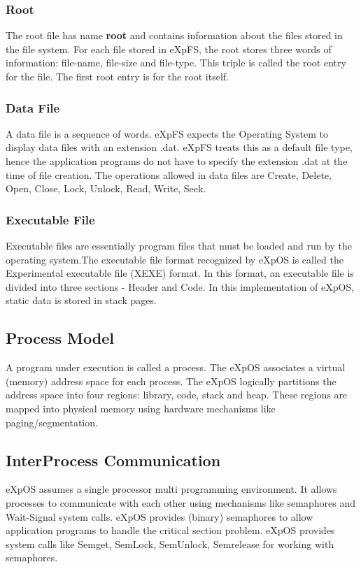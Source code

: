 \documentclass[10pt]{article}
\begin{document}
\subsubsection{Root}
The root file has name \textbf {root} and contains information about the files stored in the file system. For each file stored in eXpFS, the root stores three words of information: file-name, file-size and file-type. This triple is called the root entry for the file. The first root entry is for the root itself.  
\subsubsection{Data File}
A data file is a sequence of words. eXpFS expects the Operating System to display data files with an extension .dat.   eXpFS treats this as a default file type, hence the application programs do not have to specify the extension .dat at the time of file creation.  
The operations allowed in data files are Create, Delete, Open, Close, Lock, Unlock, Read, Write, Seek.
\subsubsection{Executable File}
Executable files are essentially program files that must be loaded and run by the operating system.The executable file format recognized by eXpOS is called the Experimental executable file (XEXE) format. In this format, an executable file is divided into three sections - Header and Code. In this implementation of eXpOS, static data is stored in stack pages.
\subsection{Process Model}
A program under execution is called a process. The eXpOS associates a virtual (memory) address space for each process. The eXpOS logically partitions the address space into four regions: library, code, stack and heap. These regions are mapped into physical memory using hardware mechanisms like paging/segmentation.
\subsection{Inter\-Process Communication}
eXpOS assumes a single processor multi programming environment. It allows processes to communicate with each other using mechanisms like semaphores and Wait-Signal system calls.
eXpOS provides (binary) semaphores to allow application programs to handle the critical section problem. eXpOS provides system calls like Semget, SemLock, SemUnlock, Semrelease for working with semaphores.
\end{document}
